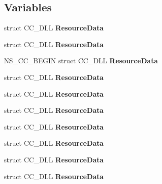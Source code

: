 \subsection*{Variables}
\begin{DoxyCompactItemize}
\item 
\mbox{\label{group__ui_gaea51324d1dbe3670e21d286c9c676c7c}} 
struct C\+C\+\_\+\+D\+LL {\bfseries Resource\+Data}
\item 
\mbox{\label{group__ui_gaea51324d1dbe3670e21d286c9c676c7c}} 
struct C\+C\+\_\+\+D\+LL {\bfseries Resource\+Data}
\item 
\mbox{\label{group__ui_gac95fff9eb385485d4b3ef6d3df393ee6}} 
N\+S\+\_\+\+C\+C\+\_\+\+B\+E\+G\+IN struct C\+C\+\_\+\+D\+LL {\bfseries Resource\+Data}
\item 
\mbox{\label{group__ui_gaea51324d1dbe3670e21d286c9c676c7c}} 
struct C\+C\+\_\+\+D\+LL {\bfseries Resource\+Data}
\item 
\mbox{\label{group__ui_gaea51324d1dbe3670e21d286c9c676c7c}} 
struct C\+C\+\_\+\+D\+LL {\bfseries Resource\+Data}
\item 
\mbox{\label{group__ui_gaea51324d1dbe3670e21d286c9c676c7c}} 
struct C\+C\+\_\+\+D\+LL {\bfseries Resource\+Data}
\item 
\mbox{\label{group__ui_gaea51324d1dbe3670e21d286c9c676c7c}} 
struct C\+C\+\_\+\+D\+LL {\bfseries Resource\+Data}
\item 
\mbox{\label{group__ui_gaea51324d1dbe3670e21d286c9c676c7c}} 
struct C\+C\+\_\+\+D\+LL {\bfseries Resource\+Data}
\item 
\mbox{\label{group__ui_gaea51324d1dbe3670e21d286c9c676c7c}} 
struct C\+C\+\_\+\+D\+LL {\bfseries Resource\+Data}
\item 
\mbox{\label{group__ui_gaea51324d1dbe3670e21d286c9c676c7c}} 
struct C\+C\+\_\+\+D\+LL {\bfseries Resource\+Data}
\item 
\mbox{\label{group__ui_gac95fff9eb385485d4b3ef6d3df393ee6}} 

\end{DoxyCompactItemize}
